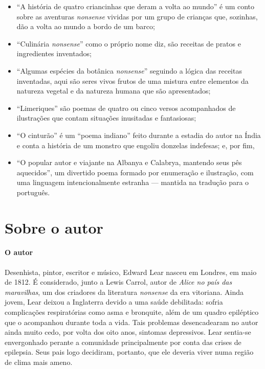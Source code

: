\documentclass[11pt]{extarticle}
\begin{document}
\begin{itemize}
\item {``A história de quatro criancinhas que deram a volta ao mundo''} é
um conto sobre as aventuras \emph{nonsense} vividas por um grupo de crianças
que, sozinhas, dão a volta ao mundo a bordo de um barco;
\item {``Culinária \emph{nonsense}''} como o próprio nome diz, 
são receitas de pratos e ingredientes inventados; 
\item {``Algumas espécies da botânica \emph{nonsense}''} seguindo a lógica das receitas inventadas,
aqui são seres vivos frutos de uma mistura entre elementos da natureza vegetal e da natureza
humana que são apresentados; 
\item {``Limeriques''} são poemas de quatro ou cinco versos acompanhados de ilustrações que contam
situações inusitadas e fantasiosas; 
\item {``O cinturão''} é um ``poema indiano'' feito durante a estadia do autor na Índia e conta a história de um 
monstro que engoliu donzelas indefesas; e, por fim,
\item {``O popular autor e viajante na Albanya e Calabrya, mantendo seus pês aquecidos''},
um divertido poema formado por enumeração e ilustração, com uma linguagem intencionalmente
estranha --- mantida na tradução para o português.
\end{itemize}


\reversemarginpar
\marginparwidth=5cm



\section{Sobre o autor}


\paragraph{O autor} Desenhista, pintor, escritor e músico, Edward Lear nasceu em Londres, em
maio de 1812. É considerado, junto a Lewis Carrol, autor de \textit{Alice no país das maravilhas},
um dos criadores da literatura \textit{nonsense} da era vitoriana.
Ainda jovem, Lear deixou a Inglaterra devido a uma saúde debilitada:
sofria complicações respiratórias como asma e bronquite, além
de um quadro epiléptico que o acompanhou durante toda a vida.
Tais problemas desencadearam no autor ainda muito cedo,
por volta dos oito anos, sintomas depressivos. Lear sentia-se 
envergonhado perante a comunidade principalmente por conta das
crises de epilepsia. Seus pais logo decidiram, portanto,
que ele deveria viver numa região de clima mais ameno.
\end{document}
